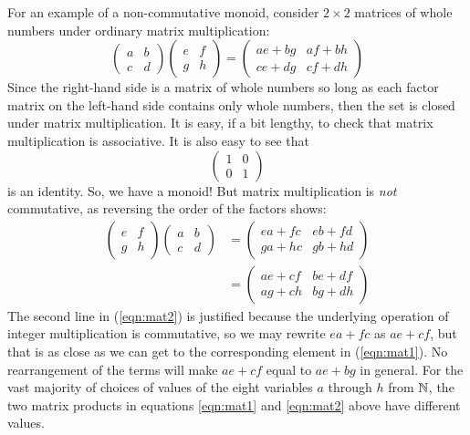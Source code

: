 For an example of a non-commutative monoid, consider $2\times 2$ matrices of whole numbers under ordinary matrix multiplication:
\begin{equation}
\left(\begin{array}{cc} a & b \\ c & d \end{array}\right)
\left(\begin{array}{cc} e & f \\ g & h \end{array}\right) =
\left(\begin{array}{cc} a e + b g & a f + b h \\ 
                        c e + d g & c f + d h \end{array}\right)
\label{eqn:mat1}
\end{equation}
Since the right-hand side is a matrix of whole numbers so long as each factor matrix on the left-hand side contains only whole numbers, then the set is closed under matrix multiplication. It is easy, if a bit lengthy, to check that matrix multiplication is associative. It is also easy to see that 
\[
\left(\begin{array}{cc} 1 & 0 \\ 0 & 1 \end{array}\right)
\]
is an identity. So, we have a monoid! But matrix multiplication is \emph{not} commutative, as reversing the order of the factors shows:
\begin{align}
\left(\begin{array}{cc} e & f \\ g & h \end{array}\right) 
\left(\begin{array}{cc} a & b \\ c & d \end{array}\right) & =
\left(\begin{array}{cc} e a + f c & e b + f d \\ 
                        g a + h c & g b + h d \end{array}\right) 
\label{eqn:mat2} \\
\nonumber
& = \left(\begin{array}{cc} ae + cf & be + df \\ 
                            ag + ch & bg + dh \end{array}\right)
\end{align}
The second line in (\ref{eqn:mat2}) is justified because the underlying operation of integer multiplication is commutative, so we may rewrite $ea+fc$ as $ae+cf$, but that is as close as we can get to the corresponding element in (\ref{eqn:mat1}). No rearrangement of the terms will make $ae+cf$ equal to $ae+bg$ in general. For the vast majority of choices of values of the eight variables $a$ through $h$ from $\mathbb{N}$, the two matrix products in equations \ref{eqn:mat1} and \ref{eqn:mat2} above have different values.


